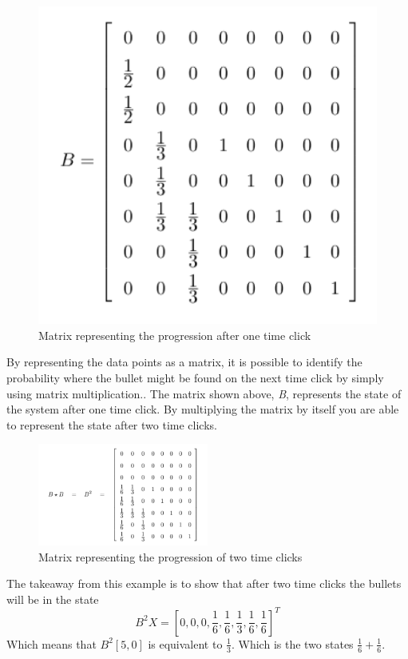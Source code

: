 \documentclass[12pt]{article}
\begin{document}
\begin{figure}
  \centering
  \caption{Matrix representing the progression after one time click}
  \includegraphics{classicB}
\end{figure}
\par
By representing the data points as a matrix, it is possible to identify the probability where the bullet might be found on the next time click by simply using matrix multiplication.\cite{intro}. The matrix shown above, \textit{B}, represents the state of the system after one time click. By multiplying the matrix by itself you are able to represent the state after two time clicks. 
\begin{figure}
  \centering
  \caption{Matrix representing the progression of two time clicks}
  \includegraphics[width=0.5\textwidth]{classicB2}
\end{figure}\par
The takeaway from this example is to show that after two time clicks the bullets will be in the state \[B^2X = [0,0,0,\frac{1}{6},\frac{1}{6},\frac{1}{3},\frac{1}{6},\frac{1}{6}]^T\]
Which means that \(B^2[5,0]\) is equivalent to \(\frac{1}{3}\). Which is the two states \(\frac{1}{6}+\frac{1}{6}\).\par
\end{document}
